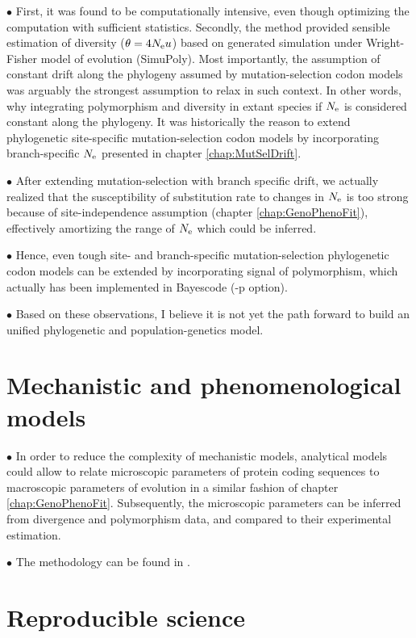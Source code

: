 $\bullet$ First, it was found to be computationally intensive, even though optimizing the computation with sufficient statistics.
Secondly, the method provided sensible estimation of diversity ($\theta = 4 N_{\textrm{e}} u$) based on generated simulation under Wright-Fisher model of evolution (SimuPoly).
Most importantly, the assumption of constant drift along the phylogeny assumed by mutation-selection \gls{codon} models was arguably the strongest assumption to relax in such context.
In other words, why integrating polymorphism and diversity in extant species if $N_{\textrm{e}}$ is considered constant along the phylogeny.
It was historically the reason to extend phylogenetic site-specific mutation-selection \gls{codon} models by incorporating branch-specific $N_{\textrm{e}}$ presented in chapter \ref{chap:MutSelDrift}.

$\bullet$ After extending mutation-selection with branch specific drift, we actually realized that the susceptibility of \gls{substitution} rate to changes in $N_{\textrm{e}}$ is too strong because of site-independence assumption (chapter \ref{chap:GenoPhenoFit}), effectively amortizing the range of $N_{\textrm{e}}$ which could be inferred.

$\bullet$ Hence, even tough site- and branch-specific mutation-selection phylogenetic \gls{codon} models can be extended by incorporating signal of polymorphism, which actually has been implemented in Bayescode (-p option).

$\bullet$ Based on these observations, I believe it is not yet the path forward to build an unified phylogenetic and population-genetics model.

\section{Mechanistic and phenomenological models}
\label{sec:mechanistic-and-phenomenological-models}

$\bullet$ In order to reduce the complexity of mechanistic models, analytical models could allow to relate microscopic parameters of protein coding sequences to macroscopic parameters of evolution in a similar fashion of chapter \ref{chap:GenoPhenoFit}.
Subsequently, the microscopic parameters can be inferred from divergence and polymorphism data, and compared to their experimental estimation.

$\bullet$ The methodology can be found in \citet{Brevet2019}.

\section{Reproducible science}
\label{sec:reproducible-science}

